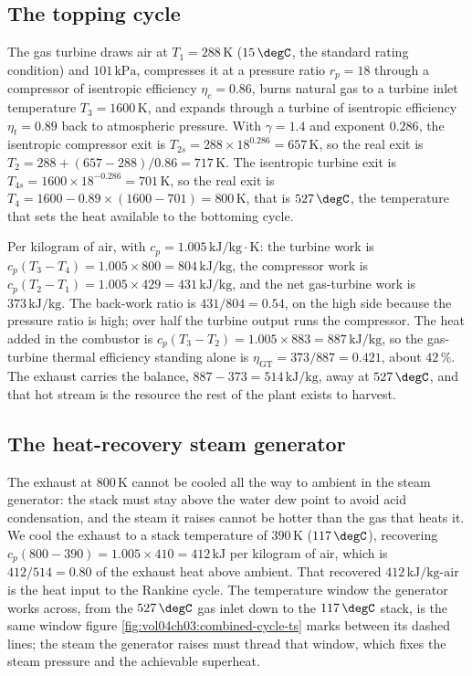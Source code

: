 \subsection{The topping cycle}

The gas turbine draws air at $T_1 = 288\,\si{\kelvin}$ ($15\,\degC$, the
standard rating condition) and $101\,\text{kPa}$, compresses it at a
pressure ratio $r_p = 18$ through a compressor of isentropic efficiency
$\eta_c = 0.86$, burns natural gas to a turbine inlet temperature $T_3 =
1600\,\si{\kelvin}$, and expands through a turbine of isentropic
efficiency $\eta_t = 0.89$ back to atmospheric pressure. With $\gamma =
1.4$ and exponent $0.286$, the isentropic compressor exit is $T_{2s} =
288 \times 18^{0.286} = 657\,\si{\kelvin}$, so the real exit is $T_2 =
288 + (657 - 288)/0.86 = 717\,\si{\kelvin}$. The isentropic turbine exit
is $T_{4s} = 1600 \times 18^{-0.286} = 701\,\si{\kelvin}$, so the real
exit is $T_4 = 1600 - 0.89 \times (1600 - 701) = 800\,\si{\kelvin}$, that
is $527\,\degC$, the temperature that sets the heat available to the
bottoming cycle.

Per kilogram of air, with $c_p = 1.005\,\text{kJ}/\text{kg}\cdot\text{K}$:
the turbine work is $c_p(T_3 - T_4) = 1.005 \times 800 = 804\,\text{kJ}/
\text{kg}$, the compressor work is $c_p(T_2 - T_1) = 1.005 \times 429 =
431\,\text{kJ}/\text{kg}$, and the net gas-turbine work is $373\,\text{kJ}
/\text{kg}$. The back-work ratio is $431/804 = 0.54$, on the high side
because the pressure ratio is high; over half the turbine output runs the
compressor. The heat added in the combustor is $c_p(T_3 - T_2) = 1.005
\times 883 = 887\,\text{kJ}/\text{kg}$, so the gas-turbine thermal
efficiency standing alone is $\eta_{\text{GT}} = 373/887 = 0.421$, about
$42\,\%$. The exhaust carries the balance, $887 - 373 = 514\,\text{kJ}/
\text{kg}$, away at $527\,\degC$, and that hot stream is the resource the
rest of the plant exists to harvest.

\subsection{The heat-recovery steam generator}

The exhaust at $800\,\si{\kelvin}$ cannot be cooled all the way to ambient
in the steam generator: the stack must stay above the water dew point to
avoid acid condensation, and the steam it raises cannot be hotter than
the gas that heats it. We cool the exhaust to a stack temperature of
$390\,\si{\kelvin}$ ($117\,\degC$), recovering $c_p(800 - 390) = 1.005
\times 410 = 412\,\text{kJ}$ per kilogram of air, which is $412/514 =
0.80$ of the exhaust heat above ambient. That recovered $412\,\text{kJ}/
\text{kg-air}$ is the heat input to the Rankine cycle. The temperature
window the generator works across, from the $527\,\degC$ gas inlet down
to the $117\,\degC$ stack, is the same window figure
\ref{fig:vol04ch03:combined-cycle-ts} marks between its dashed lines; the
steam the generator raises must thread that window, which fixes the steam
pressure and the achievable superheat.

